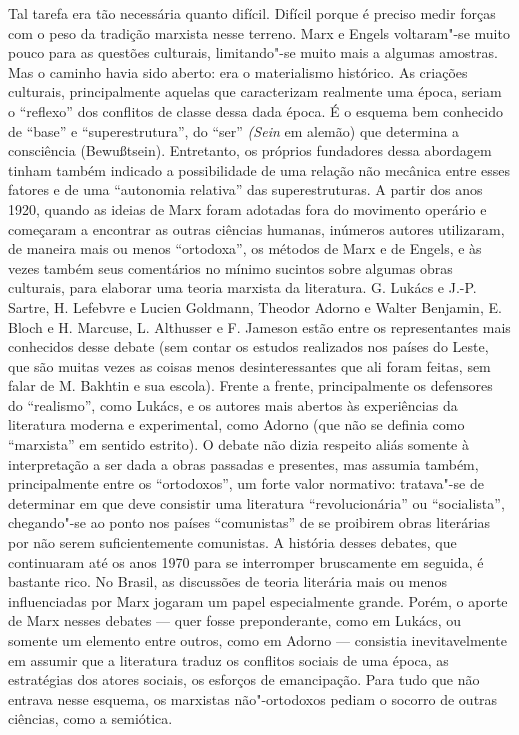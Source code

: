 Tal tarefa era tão necessária quanto difícil. Difícil porque é preciso
medir forças com o peso da tradição marxista nesse terreno. Marx e
Engels voltaram"-se muito pouco para as questões culturais, limitando"-se
muito mais a algumas amostras. Mas o caminho havia sido aberto: era o
materialismo histórico. As criações culturais, principalmente aquelas
que caracterizam realmente uma época, seriam o ``reflexo'' dos conflitos
de classe dessa dada época. É o esquema bem conhecido de ``base'' e
``superestrutura'', do ``ser'' \emph{(Sein} em alemão) que determina a
consciência (Bewußtsein). Entretanto, os próprios fundadores dessa
abordagem tinham também indicado a possibilidade de uma relação não
mecânica entre esses fatores e de uma ``autonomia relativa'' das
superestruturas. A partir dos anos 1920, quando as ideias de Marx foram
adotadas fora do movimento operário e começaram a encontrar as outras
ciências humanas, inúmeros autores utilizaram, de maneira mais ou menos
``ortodoxa'', os métodos de Marx e de Engels, e às vezes também seus
comentários no mínimo sucintos sobre algumas obras culturais, para
elaborar uma teoria marxista da literatura. G. Lukács e J.-P. Sartre, H.
Lefebvre e Lucien Goldmann, Theodor Adorno e Walter Benjamin, E. Bloch e
H. Marcuse, L. Althusser e F. Jameson estão entre os representantes mais
conhecidos desse debate (sem contar os estudos realizados nos países do
Leste, que são muitas vezes as coisas menos desinteressantes que ali
foram feitas, sem falar de M. Bakhtin e sua escola). Frente a frente,
principalmente os defensores do ``realismo'', como Lukács, e os autores
mais abertos às experiências da literatura moderna e experimental, como
Adorno (que não se definia como ``marxista'' em sentido estrito). O
debate não dizia respeito aliás somente à interpretação a ser dada a
obras passadas e presentes, mas assumia também, principalmente entre os
``ortodoxos'', um forte valor normativo: tratava"-se de determinar em que
deve consistir uma literatura ``revolucionária'' ou ``socialista'',
chegando"-se ao ponto nos países ``comunistas'' de se proibirem obras
literárias por não serem suficientemente comunistas. A história desses
debates, que continuaram até os anos 1970 para se interromper
bruscamente em seguida, é bastante rico. No Brasil, as discussões de
teoria literária mais ou menos influenciadas por Marx jogaram um papel
especialmente grande. Porém, o aporte de Marx nesses debates --- quer
fosse preponderante, como em Lukács, ou somente um elemento entre
outros, como em Adorno --- consistia inevitavelmente em assumir que a
literatura traduz os conflitos sociais de uma época, as estratégias dos
atores sociais, os esforços de emancipação. Para tudo que não entrava
nesse esquema, os marxistas não"-ortodoxos pediam o socorro de outras
ciências, como a semiótica.

